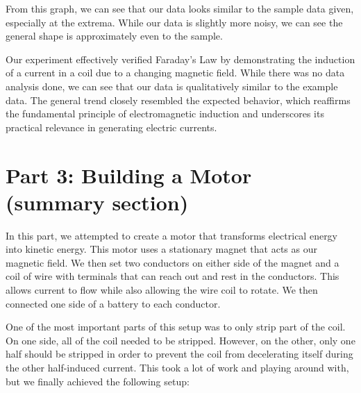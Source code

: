 \documentclass[11pt]{article}
\let\oldsection\section
\renewcommand\section{\clearpage\oldsection}
\begin{document}
    From this graph, we can see that our data looks similar to the sample data given, especially at the extrema. While our data is slightly more noisy, we can see the general shape is approximately even to the sample.

    Our experiment effectively verified Faraday’s Law by demonstrating the induction of a current in a coil due to a changing magnetic field.  While there was no data analysis done, we can see that our data is qualitatively similar to the example data. The general trend closely resembled the expected behavior, which reaffirms the fundamental principle of electromagnetic induction and underscores its practical relevance in generating electric currents.

    \section{Part 3: Building a Motor (summary section)}\label{sec:part_3}
    In this part, we attempted to create a motor that transforms electrical energy into kinetic energy. This motor uses a stationary magnet that acts as our magnetic field. We then set two conductors on either side of the magnet and a coil of wire with terminals that can reach out and rest in the conductors. This allows current to flow while also allowing the wire coil to rotate. We then connected one side of a battery to each conductor. 

    One of the most important parts of this setup was to only strip part of the coil. On one side, all of the coil needed to be stripped. However, on the other, only one half should be stripped in order to prevent the coil from decelerating itself during the other half-induced current. This took a lot of work and playing around with, but we finally achieved the following setup:
\end{document}
